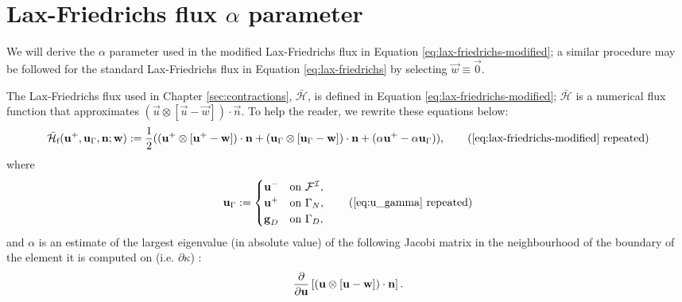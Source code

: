 \chapter{Lax-Friedrichs flux \texorpdfstring{$\alpha$}{α} parameter} \label{sec:lax-friedrichs}
    We will derive the $\alpha$ parameter used in the modified Lax-Friedrichs flux in Equation \eqref{eq:lax-friedrichs-modified}; a similar procedure may be followed for the standard Lax-Friedrichs flux in Equation \eqref{eq:lax-friedrichs} by selecting $\vec{w} \equiv \vec{0}$.
    
    The Lax-Friedrichs flux used in Chapter \ref{sec:contractions}, $\bar{\mathcal{H}}$, is defined in Equation \ref{eq:lax-friedrichs-modified}; $\bar{\mathcal{H}}$ is a numerical flux function that approximates $(\vec{u} \otimes [\vec{u} - \vec{w}]) \cdot \vec{n}$. To help the reader, we rewrite these equations below:
    \begin{equation}
        \bar{\mathcal{H}}_\text{f}(\vec{u}^+, \vec{u}_\Gamma, \vec{n}; \vec{w}) := \frac{1}{2} ((\vec{u}^+ \otimes [\vec{u}^+ - \vec{w}]) \cdot \vec{n} + (\vec{u}_\Gamma \otimes [\vec{u}_\Gamma - \vec{w}]) \cdot \vec{n} + (\alpha \vec{u}^+ - \alpha \vec{u}_\Gamma)),
        \tag{\ref{eq:lax-friedrichs-modified} repeated}
    \end{equation}
    where 
    \begin{equation}
        \vec{u}_\Gamma := 
        \begin{cases}
        \vec{u}^- & \text{on~} \mathcal{F}^\mathcal{I}, \\
            \vec{u}^+ & \text{on~} \Gamma_N, \\
            \vec{g}_D & \text{on~} \Gamma_D, 
        \end{cases}
        \tag{\ref{eq:u_gamma} repeated}
    \end{equation}
    and $\alpha$ is an estimate of the largest eigenvalue (in absolute value) of the following Jacobi matrix in the neighbourhood of the boundary of the element it is computed on (i.e. $\partial \kappa$) \cite{hartmannAdaptiveDiscontinuousGalerkin2003}:
    \begin{equation*}
        \pdv{}{\boldsymbol{\mathbf{u}}}\left[ (\boldsymbol{\mathbf{u}} \otimes [\boldsymbol{\mathbf{u}} - \boldsymbol{\mathbf{w}}]) \cdot \boldsymbol{\mathbf{n}} \right].
    \end{equation*}

